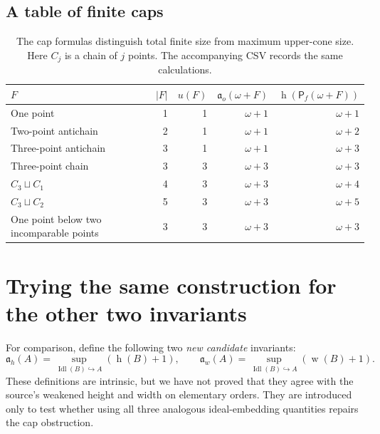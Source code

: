 \documentclass[11pt,letterpaper]{article}
\theoremstyle{teal}
\theoremstyle{definition}
\newcommand{\Pf}{\mathsf P_{\!f}}
\newcommand{\Idl}{\operatorname{Idl}}
\newcommand{\hgt}{\operatorname{h}}
\newcommand{\wid}{\operatorname{w}}
\newcommand{\ao}{\mathfrak a_o}
\newcommand{\ah}{\mathfrak a_h}
\newcommand{\aw}{\mathfrak a_w}
\newcommand{\emb}{\hookrightarrow}
\begin{document}
\subsection{A table of finite caps}
\begin{table}[htbp]
\centering
\renewcommand{\arraystretch}{1.2}
\begin{tabular}{@{}lrrrr@{}}
\toprule
$F$ & $|F|$ & $u(F)$ & $\ao(\omega+F)$ & $\hgt(\Pf(\omega+F))$\\
\midrule
One point & 1 & 1 & $\omega+1$ & $\omega+1$\\
Two-point antichain & 2 & 1 & $\omega+1$ & $\omega+2$\\
Three-point antichain & 3 & 1 & $\omega+1$ & $\omega+3$\\
Three-point chain & 3 & 3 & $\omega+3$ & $\omega+3$\\
$C_3\sqcup C_1$ & 4 & 3 & $\omega+3$ & $\omega+4$\\
$C_3\sqcup C_2$ & 5 & 3 & $\omega+3$ & $\omega+5$\\
One point below two incomparable points & 3 & 3 & $\omega+3$ & $\omega+3$\\
\bottomrule
\end{tabular}
\caption{The cap formulas distinguish total finite size from maximum upper-cone size. Here $C_j$ is a chain of $j$ points. The accompanying CSV records the same calculations.}
\label{tab:caps}
\end{table}

\section{Trying the same construction for the other two invariants}
For comparison, define the following two \emph{new candidate} invariants:
\[
 \ah(A)=\sup_{\Idl(B)\emb A}(\hgt(B)+1),\qquad
 \aw(A)=\sup_{\Idl(B)\emb A}(\wid(B)+1).
\]
These definitions are intrinsic, but we have not proved that they agree with the source's weakened height and width on elementary orders. They are introduced only to test whether using all three analogous ideal-embedding quantities repairs the cap obstruction.
\end{document}
